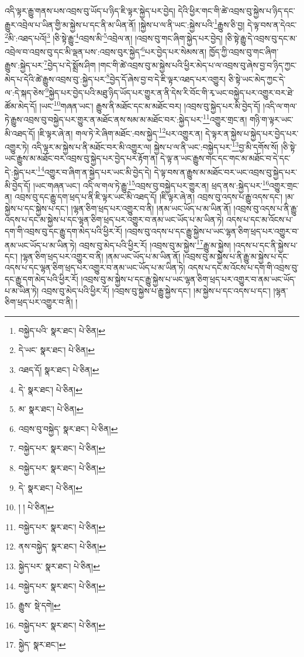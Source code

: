 འདི་ལྟར་རྒྱུ་གནས་པས་འབྲས་བུ་ཡོད་པ་ཉིད་ཇི་ལྟར་སྐྱེད་པར་བྱེད། དེའི་ཕྱིར་གང་གི་ཚེ་འབྲས་བུ་སྐྱེས་པ་ཉིད་དང་རྒྱུར་འབྲེལ་པ་ཡིན་གྱི་མ་སྐྱེས་པ་དང་ནི་མ་ཡིན་ནོ། །སྐྱེས་པ་ལ་ནི་ཡང་:སྐྱེས་པའི་\footnote{བསྐྱེད་པའི་  སྣར་ཐང་།  པེ་ཅིན། }རྒྱུས་ཅི་བྱ། དེ་ལྟ་བས་ན་དེའང་\footnote{དེ་ཡང་  སྣར་ཐང་།  པེ་ཅིན། }མི་:འཐད་པའོ།\footnote{འཐད་དོ།  སྣར་ཐང་།  པེ་ཅིན། } །ཅི་སྟེ་རྒྱུ་\footnote{དེ་  སྣར་ཐང་།  པེ་ཅིན། }འབྲས་མི་\footnote{མ་  སྣར་ཐང་།  པེ་ཅིན། }འབྲེལ་ན། །འབྲས་བུ་གང་ཞིག་སྐྱེད་པར་བྱེད། །ཅི་སྟེ་རྒྱུ་དེ་འབྲས་བུ་དང་མ་འབྲེལ་བ་འབྲས་བུ་དང་མི་ལྡན་པས་:འབྲས་བུར་སྐྱེད་\footnote{འབྲས་བུ་བསྐྱེད་  སྣར་ཐང་།  པེ་ཅིན། }པར་བྱེད་པར་སེམས་ན། ཁྱོད་ཀྱི་འབྲས་བུ་གང་ཞིག་རྒྱུས་:སྐྱེད་པར་\footnote{བསྐྱེད་པར་  སྣར་ཐང་།  པེ་ཅིན། }བྱེད་པ་དེ་སྨྲོས་ཤིག །གང་གི་ཚེ་འབྲས་བུ་མ་སྐྱེས་པའི་ཕྱིར་མེད་པ་ལ་འབྲས་བུ་ཞེས་བྱ་བ་ཉིད་ཀྱང་མེད་པ་དེའི་ཚེ་རྒྱུས་འབྲས་བུ་:སྐྱེད་པར་\footnote{བསྐྱེད་པར་  སྣར་ཐང་།  པེ་ཅིན། }བྱེད་དོ་ཞེས་བྱ་བ་དེ་ཇི་ལྟར་འཐད་པར་འགྱུར། ཅི་སྟེ་ཡང་མེད་ཀྱང་དེ་ལ་:དེ་སྐད་ཅེས་\footnote{དེ་  སྣར་ཐང་།  པེ་ཅིན། }སྐྱེད་པར་བྱེད་པའི་མཐུ་ཉིད་ཡོད་པར་གྱུར་ན་ནི་དེས་རི་བོང་གི་རྭ་ཡང་བསྐྱེད་པར་འགྱུར་བར་ཐེ་ཚོམ་མེད་དོ། །ཡང་\footnote{། །  པེ་ཅིན། }གཞན་ཡང་། རྒྱུས་ནི་མཐོང་དང་མ་མཐོང་བར། །འབྲས་བུ་སྐྱེད་པར་མི་བྱེད་དོ། །འདི་ལ་གལ་ཏེ་རྒྱུས་འབྲས་བུ་བསྐྱེད་པར་གྱུར་ན་མཐོང་ནས་སམ་མ་མཐོང་བར་:སྐྱེད་པར་\footnote{བསྐྱེད་པར་  སྣར་ཐང་།  པེ་ཅིན། }འགྱུར་གྲང་ན། གཉི་ག་ལྟར་ཡང་མི་འཐད་དོ། །ཇི་ལྟར་ཞེ་ན། གལ་ཏེ་རེ་ཞིག་མཐོང་:བས་སྐྱེད་\footnote{ནས་བསྐྱེད་  སྣར་ཐང་།  པེ་ཅིན། }པར་འགྱུར་ན། དེ་ལྟར་ན་སྐྱེས་པ་སྐྱེད་པར་བྱེད་པར་འགྱུར་ཏེ། འདི་ལྟར་མ་སྐྱེས་པ་ནི་མཐོང་བར་མི་འགྱུར་ལ། སྐྱེས་པ་ལ་ནི་ཡང་:བསྐྱེད་པར་\footnote{སྐྱེད་པར་  སྣར་ཐང་།  པེ་ཅིན། }བྱ་མི་དགོས་སོ། །ཅི་སྟེ་ཡང་རྒྱུས་མ་མཐོང་བར་འབྲས་བུ་སྐྱེད་པར་བྱེད་པར་རྟོག་ན། དེ་ལྟ་ན་ཡང་རྒྱུས་གང་དང་གང་མ་མཐོང་བ་དེ་དང་དེ་:སྐྱེད་པར་\footnote{བསྐྱེད་པར་  སྣར་ཐང་།  པེ་ཅིན། }འགྱུར་བ་ཞིག་ན་སྐྱེད་པར་ཡང་མི་བྱེད་དེ། དེ་ལྟ་བས་ན་རྒྱུས་མ་མཐོང་བར་ཡང་འབྲས་བུ་སྐྱེད་པར་མི་བྱེད་དོ། །ཡང་གཞན་ཡང་། འདི་ལ་གལ་ཏེ་རྒྱུ་\footnote{རྒྱུས་  སྡེ་དགེ། }འབྲས་བུ་བསྐྱེད་པར་གྱུར་ན། ཕྲད་ནས་:སྐྱེད་པར་\footnote{བསྐྱེད་པར་  སྣར་ཐང་།  པེ་ཅིན། }འགྱུར་གྲང་ན། འབྲས་བུ་དང་རྒྱུ་དག་ཕྲད་པ་ནི་ཇི་ལྟར་ཡང་མི་འཐད་དོ། །ཇི་ལྟར་ཞེ་ན། འབྲས་བུ་འདས་པ་རྒྱུ་འདས་དང་། །མ་སྐྱེས་པ་དང་སྐྱེས་པ་དང་། །ལྷན་ཅིག་ཕྲད་པར་འགྱུར་བ་ནི། །ནམ་ཡང་ཡོད་པ་མ་ཡིན་ནོ། །འབྲས་བུ་འདས་པ་ནི་རྒྱུ་འདས་པ་དང་མ་སྐྱེས་པ་དང་ལྷན་ཅིག་ཕྲད་པར་འགྱུར་བ་ནམ་ཡང་ཡོད་པ་མ་ཡིན་ཏེ། འདས་པ་དང་མ་འོངས་པ་དག་གི་འབྲས་བུ་དང་རྒྱུ་དག་མེད་པའི་ཕྱིར་རོ། །འབྲས་བུ་འདས་པ་དང་རྒྱུ་སྐྱེས་པ་ཡང་ལྷན་ཅིག་ཕྲད་པར་འགྱུར་བ་ནམ་ཡང་ཡོད་པ་མ་ཡིན་ཏེ། འབྲས་བུ་མེད་པའི་ཕྱིར་རོ། །འབྲས་བུ་མ་སྐྱེས་\footnote{སྐྱེད་  སྣར་ཐང་། }རྒྱུ་མ་སྐྱེས། །འདས་པ་དང་ནི་སྐྱེས་པ་དང་། །ལྷན་ཅིག་ཕྲད་པར་འགྱུར་བ་ནི། །ནམ་ཡང་ཡོད་པ་མ་ཡིན་ནོ། །འབྲས་བུ་མ་སྐྱེས་པ་ནི་རྒྱུ་མ་སྐྱེས་པ་དང་འདས་པ་དང་ལྷན་ཅིག་ཕྲད་པར་འགྱུར་བ་ནམ་ཡང་ཡོད་པ་མ་ཡིན་ཏེ། འདས་པ་དང་མ་འོངས་པ་དག་གི་འབྲས་བུ་དང་རྒྱུ་དག་མེད་པའི་ཕྱིར་རོ། །འབྲས་བུ་མ་སྐྱེས་པ་དང་རྒྱུ་སྐྱེས་པ་ཡང་ལྷན་ཅིག་ཕྲད་པར་འགྱུར་བ་ནམ་ཡང་ཡོད་པ་མ་ཡིན་ཏེ། འབྲས་བུ་མེད་པའི་ཕྱིར་རོ། །འབྲས་བུ་སྐྱེས་པ་རྒྱུ་སྐྱེས་དང་། །མ་སྐྱེས་པ་དང་འདས་པ་དང་། །ལྷན་ཅིག་ཕྲད་པར་འགྱུར་བ་ནི། །

